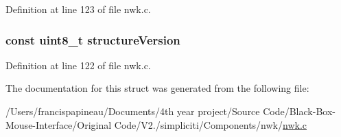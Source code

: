 \-Definition at line 123 of file nwk.\-c.

\hypertarget{structpersistentContext__t_abaeac73e5d38f919c1377241bb5ad908}{
\subsubsection[{structure\-Version}]{\setlength{\rightskip}{0pt plus 5cm}const {\bf uint8\-\_\-t} {\bf structure\-Version}}}\label{structpersistentContext__t_abaeac73e5d38f919c1377241bb5ad908}


\-Definition at line 122 of file nwk.\-c.



\-The documentation for this struct was generated from the following file\-:\begin{DoxyCompactItemize}
\item 
/\-Users/francispapineau/\-Documents/4th year project/\-Source Code/\-Black-\/\-Box-\/\-Mouse-\/\-Interface/\-Original Code/\-V2./simpliciti/\-Components/nwk/\hyperlink{nwk_8c}{nwk.\-c}\end{DoxyCompactItemize}
